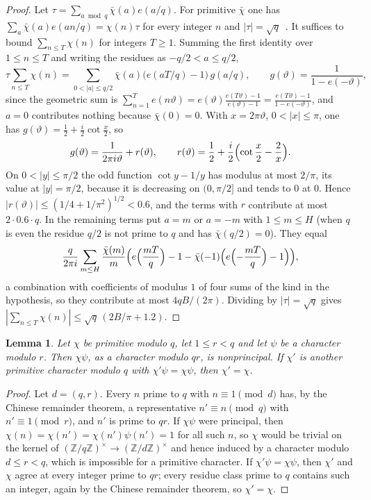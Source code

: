 \documentclass[11pt,a4paper,reqno]{amsart}
\newtheorem{lemma}[theorem]{Lemma}
\theoremstyle{remark}
\numberwithin{equation}{section}
\newcommand{\Z}{\mathbb{Z}}
\begin{document}
\begin{proof}
Let $\tau=\sum_{a\bmod q}\bar\chi(a)e(a/q)$. For primitive $\bar\chi$ one has $\sum_a\bar\chi(a)e(an/q)=\chi(n)\tau$ for every integer $n$ and $|\tau|=\sqrt q$~\cite[Chapter~9]{Dav00}. It suffices to bound $\sum_{n\le T}\chi(n)$ for integers $T\ge1$. Summing the first identity over $1\le n\le T$ and writing the residues as $-q/2<a\le q/2$,
\[
  \tau\sum_{n\le T}\chi(n)=\sum_{0<|a|\le q/2}\bar\chi(a)\bigl(e(aT/q)-1\bigr)\,g(a/q),\qquad g(\vartheta)=\frac{1}{1-e(-\vartheta)},
\]
since the geometric sum is $\sum_{n=1}^Te(n\vartheta)=e(\vartheta)\frac{e(T\vartheta)-1}{e(\vartheta)-1}=\frac{e(T\vartheta)-1}{1-e(-\vartheta)}$, and $a=0$ contributes nothing because $\bar\chi(0)=0$. With $x=2\pi\vartheta$, $0<|x|\le\pi$, one has $g(\vartheta)=\frac12+\frac i2\cot\frac x2$, so
\[
  g(\vartheta)=\frac1{2\pi i\vartheta}+r(\vartheta),\qquad r(\vartheta)=\frac12+\frac i2\Bigl(\cot\frac x2-\frac2x\Bigr).
\]
On $0<|y|\le\pi/2$ the odd function $\cot y-1/y$ has modulus at most $2/\pi$, its value at $|y|=\pi/2$, because it is decreasing on $(0,\pi/2]$ and tends to $0$ at $0$. Hence $|r(\vartheta)|\le(1/4+1/\pi^2)^{1/2}<0.6$, and the terms with $r$ contribute at most $2\cdot0.6\cdot q$. In the remaining terms put $a=m$ or $a=-m$ with $1\le m\le H$ (when $q$ is even the residue $q/2$ is not prime to $q$ and has $\bar\chi(q/2)=0$). They equal
\[
  \frac q{2\pi i}\sum_{m\le H}\frac{\bar\chi(m)}m\Bigl(e\Bigl(\frac{mT}q\Bigr)-1-\bar\chi(-1)\Bigl(e\Bigl(-\frac{mT}q\Bigr)-1\Bigr)\Bigr),
\]
a combination with coefficients of modulus $1$ of four sums of the kind in the hypothesis, so they contribute at most $4qB/(2\pi)$. Dividing by $|\tau|=\sqrt q$ gives $|\sum_{n\le T}\chi(n)|\le\sqrt q\,(2B/\pi+1.2)$.
\end{proof}

\begin{lemma}\label{lem:twist}
Let $\chi$ be primitive modulo $q$, let $1\le r<q$ and let $\psi$ be a character modulo $r$. Then $\chi\psi$, as a character modulo $qr$, is nonprincipal. If $\chi'$ is another primitive character modulo $q$ with $\chi'\psi=\chi\psi$, then $\chi'=\chi$.
\end{lemma}

\begin{proof}
Let $d=(q,r)$. Every $n$ prime to $q$ with $n\equiv1\pmod d$ has, by the Chinese remainder theorem, a representative $n'\equiv n\pmod q$ with $n'\equiv1\pmod r$, and $n'$ is prime to $qr$. If $\chi\psi$ were principal, then $\chi(n)=\chi(n')=\chi(n')\psi(n')=1$ for all such $n$, so $\chi$ would be trivial on the kernel of $(\Z/q\Z)^\times\to(\Z/d\Z)^\times$ and hence induced by a character modulo $d\le r<q$, which is impossible for a primitive character. If $\chi'\psi=\chi\psi$, then $\chi'$ and $\chi$ agree at every integer prime to $qr$; every residue class prime to $q$ contains such an integer, again by the Chinese remainder theorem, so $\chi'=\chi$.
\end{proof}
\end{document}
